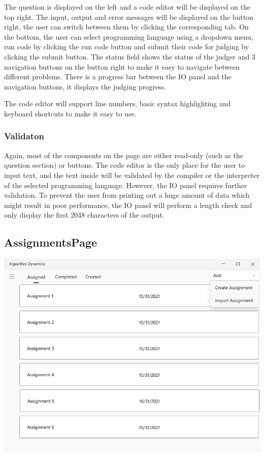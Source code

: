\documentclass[a4paper]{report}
\begin{document}
The question is displayed on the left and a code editor will be displayed on the top right. The input, output and error messages will be displayed on the button right, the user can switch between them by clicking the corresponding tab. On the bottom, the user can select programming language using a dropdown menu, run code by clicking the run code button and submit their code for judging by clicking the submit button. The status field shows the status of the judger and 3 navigation buttons on the button right to make it easy to navigate between different problems. There is a progress bar between the IO panel and the navigation buttons, it displays the judging progress.

The code editor will support line numbers, basic syntax highlighting and keyboard shortcuts to make it easy to use.

\subsubsection{Validaton}

Again, most of the components on the page are either read-only (such as the question section) or buttons. The code editor is the only place for the user to input text, and the text inside will be validated by the compiler or the interpreter of the selected programming language. However, the IO panel requires further validation. To prevent the user from printing out a huge amount of data which might result in poor performance, the IO panel will perform a length check and only display the first 2048 characters of the output.

\subsection{AssignmentsPage}

\includegraphics[width=\textwidth, height=\textheight, keepaspectratio]{AssignmentsPage-design}
\end{document}
